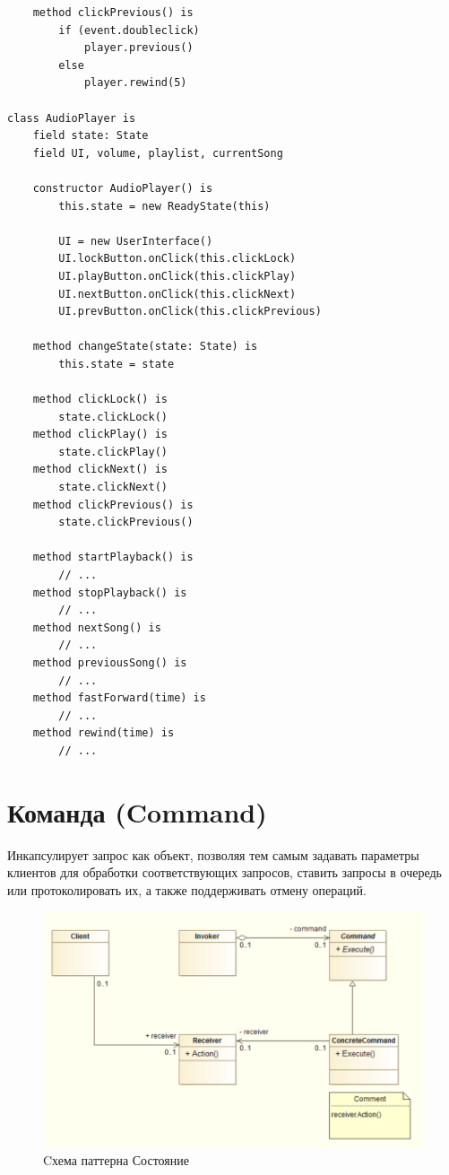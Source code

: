 \begin{lstlisting}
    method clickPrevious() is
        if (event.doubleclick)
            player.previous()
        else
            player.rewind(5)

class AudioPlayer is
    field state: State
    field UI, volume, playlist, currentSong

    constructor AudioPlayer() is
        this.state = new ReadyState(this)

        UI = new UserInterface()
        UI.lockButton.onClick(this.clickLock)
        UI.playButton.onClick(this.clickPlay)
        UI.nextButton.onClick(this.clickNext)
        UI.prevButton.onClick(this.clickPrevious)

    method changeState(state: State) is
        this.state = state

    method clickLock() is
        state.clickLock()
    method clickPlay() is
        state.clickPlay()
    method clickNext() is
        state.clickNext()
    method clickPrevious() is
        state.clickPrevious()

    method startPlayback() is
        // ...
    method stopPlayback() is
        // ...
    method nextSong() is
        // ...
    method previousSong() is
        // ...
    method fastForward(time) is
        // ...
    method rewind(time) is
        // ...
\end{lstlisting}

\section{Команда (Command)}
Инкапсулирует запрос как объект, позволяя тем самым задавать параметры
клиентов для обработки соответствующих запросов, ставить запросы в
очередь или протоколировать их, а также поддерживать отмену операций.
\begin{figure}[!ht]
\begin{center}
\includegraphics[scale=0.7]{images/pic/pic28-4.png}\caption{Cхема паттерна Состояние}\label{figure1}
\end{center}
\end{figure}
